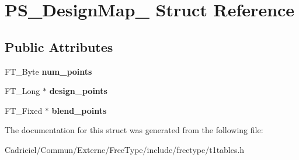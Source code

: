 \hypertarget{struct_p_s___design_map__}{}\section{P\+S\+\_\+\+Design\+Map\+\_\+ Struct Reference}
\label{struct_p_s___design_map__}
\subsection*{Public Attributes}
\begin{DoxyCompactItemize}
\item 
F\+T\+\_\+\+Byte {\bfseries num\+\_\+points}\hypertarget{struct_p_s___design_map___a505a70dd0f497f177fffca9bc4e5d0a5}{}\label{struct_p_s___design_map___a505a70dd0f497f177fffca9bc4e5d0a5}

\item 
F\+T\+\_\+\+Long $\ast$ {\bfseries design\+\_\+points}\hypertarget{struct_p_s___design_map___abd7a86ba33248ceed657c31063b49679}{}\label{struct_p_s___design_map___abd7a86ba33248ceed657c31063b49679}

\item 
F\+T\+\_\+\+Fixed $\ast$ {\bfseries blend\+\_\+points}\hypertarget{struct_p_s___design_map___a74a555fb4315fca7477f6d20d49686ec}{}\label{struct_p_s___design_map___a74a555fb4315fca7477f6d20d49686ec}

\end{DoxyCompactItemize}


The documentation for this struct was generated from the following file\+:\begin{DoxyCompactItemize}
\item 
Cadriciel/\+Commun/\+Externe/\+Free\+Type/include/freetype/t1tables.\+h\end{DoxyCompactItemize}
